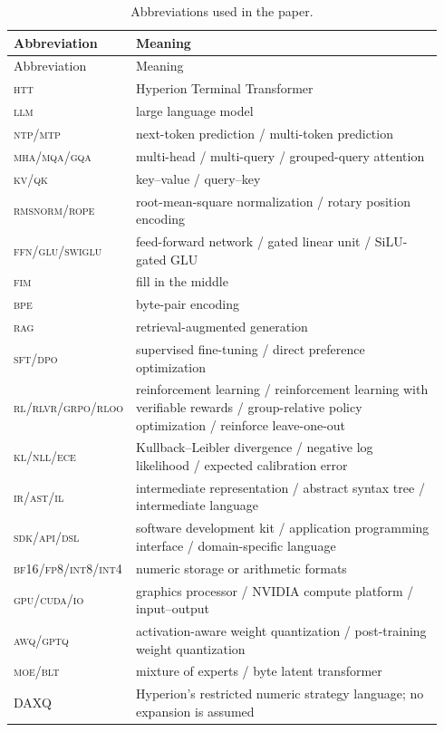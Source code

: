 \documentclass[10pt,letterpaper]{article}
\newcommand{\abbr}[1]{\textsc{\MakeLowercase{#1}}}
\newcommand{\1}{\mathbb{1}}
\begin{document}
\begin{longtable}{@{}L{0.21\linewidth}L{0.73\linewidth}@{}}
\caption{Abbreviations used in the paper.}\label{tab:abbreviations}\\
\toprule Abbreviation & Meaning \\
\midrule
\endfirsthead
\toprule Abbreviation & Meaning \\
\midrule
\endhead
\abbr{HTT} & Hyperion Terminal Transformer \\
\abbr{LLM} & large language model \\
\abbr{NTP}/\abbr{MTP} & next-token prediction / multi-token prediction \\
\abbr{MHA}/\abbr{MQA}/\abbr{GQA} & multi-head / multi-query / grouped-query attention \\
\abbr{KV}/\abbr{QK} & key--value / query--key \\
\abbr{RMSNorm}/\abbr{RoPE} & root-mean-square normalization / rotary position encoding \\
\abbr{FFN}/\abbr{GLU}/\abbr{SwiGLU} & feed-forward network / gated linear unit / SiLU-gated GLU \\
\abbr{FIM} & fill in the middle \\
\abbr{BPE} & byte-pair encoding \\
\abbr{RAG} & retrieval-augmented generation \\
\abbr{SFT}/\abbr{DPO} & supervised fine-tuning / direct preference optimization \\
\abbr{RL}/\abbr{RLVR}/\abbr{GRPO}/\abbr{RLOO} & reinforcement learning / reinforcement learning
with verifiable rewards / group-relative policy optimization / reinforce leave-one-out \\
\abbr{KL}/\abbr{NLL}/\abbr{ECE} & Kullback--Leibler divergence / negative log likelihood /
expected calibration error \\
\abbr{IR}/\abbr{AST}/\abbr{IL} & intermediate representation / abstract syntax tree /
intermediate language \\
\abbr{SDK}/\abbr{API}/\abbr{DSL} & software development kit / application programming interface /
domain-specific language \\
\abbr{BF16}/\abbr{FP8}/\abbr{INT8}/\abbr{INT4} & numeric storage or arithmetic formats \\
\abbr{GPU}/\abbr{CUDA}/\abbr{IO} & graphics processor / NVIDIA compute platform / input--output \\
\abbr{AWQ}/\abbr{GPTQ} & activation-aware weight quantization / post-training weight quantization \\
\abbr{MoE}/\abbr{BLT} & mixture of experts / byte latent transformer \\
DAXQ & Hyperion's restricted numeric strategy language; no expansion is assumed \\
\bottomrule
\end{longtable}
\end{document}
